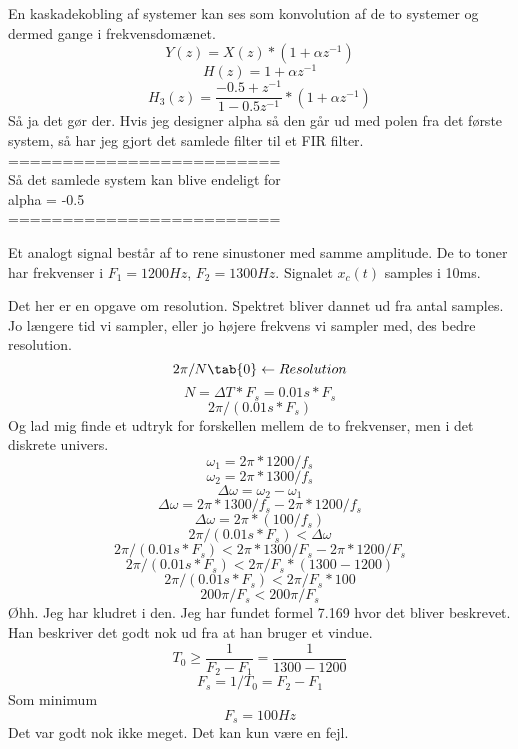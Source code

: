 \begin{rubrik}
\begin{eksamensOpgave}
\begin{UnderOpgave}
            En kaskadekobling af systemer kan ses som konvolution af de to systemer og dermed gange i frekvensdomænet. 
            \[Y(z) = X(z) * (1 + \alpha z^{-1})\]
            \[H(z) = 1 + \alpha z^{-1}\]
            \[H_3(z) = \frac{-0.5 + z^{-1}}{1 - 0.5z^{-1}} * (1 + \alpha z^{-1})\]
            Så ja det gør der. Hvis jeg designer alpha så den går ud med polen fra det første system, så har jeg gjort det samlede filter til et FIR filter.\\
            =========================\\
            Så det samlede system kan blive endeligt for \\
            alpha = -0.5 \\
            =========================\\
        \end{UnderOpgave} 
    \end{eksamensOpgave}
    \begin{eksamensOpgave}
        Et analogt signal består af to rene sinustoner med samme amplitude. De to toner har frekvenser i $F_1 = 1200Hz$, $F_2 = 1300Hz$. Signalet $x_c(t)$ samples i 10ms.
        \begin{UnderOpgave}
            Det her er en opgave om resolution.
            Spektret bliver dannet ud fra antal samples. Jo længere tid vi sampler, eller jo højere frekvens vi sampler med, des bedre resolution. 
            \[2\pi/N \tab{0} \leftarrow Resolution\] 
            \[N = \Delta T * F_s = 0.01s * F_s\]
            \[2\pi/(0.01s * F_s)\] 
            Og lad mig finde et udtryk for forskellen mellem de to frekvenser, men i det diskrete univers. 
            \[\omega_1 = 2\pi * 1200/f_s\]
            \[\omega_2 = 2\pi * 1300/f_s\]
            \[\Delta\omega = \omega_2 - \omega_1\]
            \[\Delta\omega = 2\pi * 1300/f_s - 2\pi * 1200/f_s\] 
            \[\Delta\omega = 2\pi * (100/f_s)\]
            \[2\pi/(0.01s * F_s) < \Delta\omega \] 
            \[2\pi/(0.01s * F_s) < 2\pi * 1300/F_s - 2\pi * 1200/F_s\] 
            \[2\pi/(0.01s * F_s) < 2\pi/F_s * (1300 - 1200)\] 
            \[2\pi/(0.01s * F_s) < 2\pi/F_s * 100\] 
            \[200\pi/F_s < 200\pi/F_s\] 
            Øhh. 
            Jeg har kludret i den. 
            Jeg har fundet formel 7.169 hvor det bliver beskrevet. 
            Han beskriver det godt nok ud fra at han bruger et vindue. 
            \[T_0 \geq \frac{1}{F_2 - F_1} = \frac{1}{1300 - 1200}\]
            \[F_s = 1/T_0 = F_2 - F_1\]
            Som minimum
            \[F_s = 100Hz\] 
            Det var godt nok ikke meget. Det kan kun være en fejl. 
            

\end{UnderOpgave}
\end{eksamensOpgave}
\end{rubrik}
